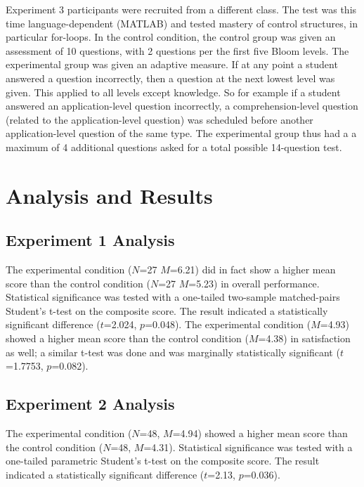 Experiment 3 participants were recruited from a different class. The test was
this time language-dependent (MATLAB) and tested mastery of control structures,
in particular for-loops.  In the control condition, the control group was given
an assessment of 10 questions, with 2 questions per the first five Bloom
levels. The experimental group was given an adaptive measure.  If at any point
a student answered a question incorrectly, then a question at the next lowest
level was given.  This applied to all levels except knowledge.  So for example
if a student answered an application-level question incorrectly, a
comprehension-level question (related to the application-level question) was
scheduled before another application-level question of the same type.  The
experimental group thus had a a maximum of 4 additional questions asked for a
total possible 14-question test.

\section{Analysis and Results}

\subsection{Experiment 1 Analysis} 

The experimental condition ($N$=27 $M$=6.21) did in fact show a higher mean
score than the control condition ($N$=27 $M$=5.23) in overall performance.
Statistical significance was tested with a one-tailed two-sample matched-pairs
Student's t-test on the composite score. The result indicated a statistically
significant difference ($t$=2.024, $p$=0.048).  The experimental condition
($M$=4.93) showed a higher mean score than the control condition ($M$=4.38) in
satisfaction as well; a similar t-test was done and was marginally
statistically significant ($t$=1.7753, $p$=0.082).  


\subsection{Experiment 2 Analysis} 

The experimental condition ($N$=48, $M$=4.94) showed a higher mean score than
the control condition ($N$=48, $M$=4.31).  Statistical significance was tested
with a one-tailed parametric Student's t-test on the composite score.  The
result indicated a statistically significant difference ($t$=2.13, $p$=0.036).

